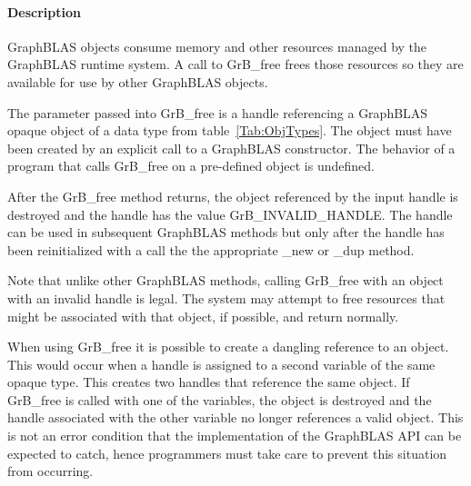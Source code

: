 \paragraph{Description}

GraphBLAS objects consume memory and other resources managed by the
GraphBLAS runtime system. A call to {\sf GrB\_free} frees those resources
so they are available for use by other GraphBLAS objects.

The parameter passed into {\sf GrB\_free} is a handle referencing a
GraphBLAS opaque object of a data type from table~\ref{Tab:ObjTypes}.
The object must have been created by an explicit call to a GraphBLAS
constructor.  The behavior of a program that calls {\sf GrB\_free}
on a pre-defined object is undefined.

After the {\sf GrB\_free} method returns, the object referenced
by the input handle is destroyed and the handle has the value {\sf
GrB\_INVALID\_HANDLE}.  The handle can be used in subsequent GraphBLAS
methods but only after the handle has been reinitialized with a call
the the appropriate {\sf \_new} or {\sf \_dup} method.

Note that unlike other GraphBLAS methods, calling {\sf GrB\_free} with
an object with an invalid handle is legal.  The system may attempt to
free resources that might be associated with that object, if possible,
and return normally.

When using {\sf GrB\_free} it is possible to create a dangling reference
to an object.  This would occur when a handle is assigned to a second
variable of the same opaque type.  This creates two handles that reference
the same object. If {\sf GrB\_free} is called with one of the variables,
the object is destroyed and the handle associated with the other variable
no longer references a valid object.  This is not an error condition
that the implementation of the GraphBLAS API can be expected to catch,
hence programmers must take care to prevent this situation from occurring.
